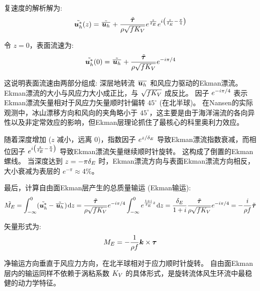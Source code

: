 复速度的解析解为:
\begin{equation}
    \tilde{\bm{u}_h^*}(z) = \tilde{\mkern2mu \overline{\bm{u}_h} \mkern2mu} + \frac{\tilde{{\bm{\tau}}}}{\rho \sqrt{f K_V}} e^{\frac{z}{\delta_E}} e^{i \left(\frac{z}{\delta_E} - \frac{\pi}{4}\right)}
    \label{eq:ekman_fs_solution}
\end{equation}

令 $z = 0$，表面流速为:
\begin{equation}
    \tilde{\bm{u}_h^*}(0) = \tilde{\mkern2mu \overline{\bm{u}_h} \mkern2mu} + \frac{\tilde{{\bm{\tau}}}}{\rho \sqrt{f K_V}} e^{-i \pi/4}
    \label{eq:ekman_fs_surface_velocity}
\end{equation}

这说明表面流速由两部分组成: 深层地转流 $\mkern2mu \overline{\bm{u}_h} \mkern2mu$ 和风应力驱动的Ekman漂流。
Ekman漂流的大小与风应力大小成正比，与 $\sqrt{f K_V}$ 成反比。
因子 $e^{-i \pi/4}$ 表示Ekman漂流矢量相对于风应力矢量顺时针偏转 $45^\circ$ (在北半球)。
在Nansen的实际观测中，冰山漂移方向和风向的夹角略小于 $45^\circ$，这主要是由于海洋湍流的各向异性以及非定常效应的影响，但Ekman层理论抓住了最核心的科里奥利力效应。

随着深度增加 ($z$ 减小，远离 $0$)，指数因子 $e^{z/\delta_E}$ 导致Ekman漂流指数衰减，而相位因子 $e^{i \left(\frac{z}{\delta_E} - \frac{\pi}{4}\right)}$ 导致Ekman漂流矢量继续顺时针旋转。
这构成了倒置的Ekman螺线。
当深度达到 $z = -\pi \delta_E$ 时，Ekman漂流方向与表面Ekman漂流方向相反，大小衰减为表层的 $e^{-\pi} \approx 4\%$。

最后，计算自由面Ekman层产生的总质量输运 (Ekman输运):
\begin{equation*}
    \tilde{M_E} = \int_{-\infty}^0 (\tilde{\bm{u}_h^*} - \tilde{\mkern2mu \overline{\bm{u}_h} \mkern2mu}) \mkern2mu \mathrm{d} z = \frac{\tilde{{\bm{\tau}}}}{\rho \sqrt{f K_V}} e^{-i \pi/4} \int_{-\infty}^0 e^{\frac{1+i}{\delta_E}z} \mkern2mu \mathrm{d} z = \frac{\delta_E}{1+i} \frac{\tilde{{\bm{\tau}}}}{\rho \sqrt{f K_V}} e^{-i \pi/4} = -\frac{i}{\rho f} \tilde{{\bm{\tau}}}
\end{equation*}

矢量形式为:
\begin{equation}
    M_E = -\frac{1}{\rho f} \bm{k} \times {\bm{\tau}}
    \label{eq:ekman_fs_transport}
\end{equation}

净输运方向垂直于风应力方向，在北半球相对于应力顺时针旋转。
自由面Ekman层内的输运同样不依赖于涡粘系数 $K_V$ 的具体形式，是旋转流体风生环流中最稳健的动力学特征。

